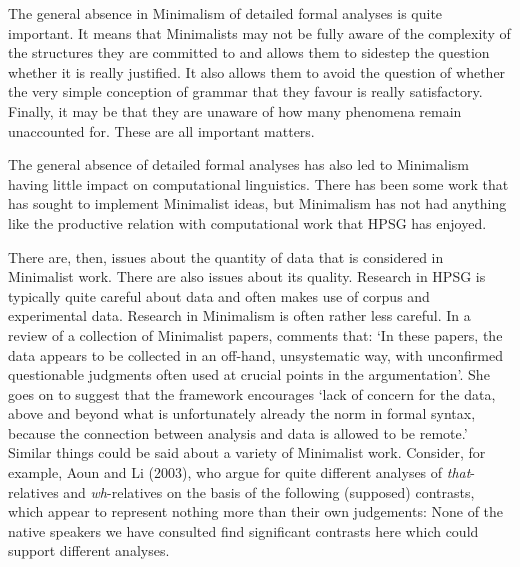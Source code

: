 \documentclass[output=paper]{langsci/langscibook}
\begin{document}
The general absence in Minimalism of detailed formal analyses is quite important. It means that Minimalists may not be fully aware of the complexity of the structures they are committed to and allows them to sidestep the question whether it is really justified. It also allows them to avoid the question of whether the very simple conception of grammar that they favour is really satisfactory. Finally, it may be that they are unaware of how many phenomena remain unaccounted for. These are all important matters. 

The general absence of detailed formal analyses has also led to Minimalism having little impact on computational linguistics. There has been some work that has sought to implement Minimalist ideas, but Minimalism has not had anything like the productive relation with computational work that HPSG has enjoyed.

There are, then, issues about the quantity of data that is considered in Minimalist work. There are also issues about its quality. Research in HPSG is typically quite careful about data and often makes use of corpus and experimental data. Research in Minimalism is often rather less careful. In a review of a collection of Minimalist papers, \citet[434]{Bender2002a} comments that: `In these papers, the data appears to be collected in an off-hand, unsystematic way, with unconfirmed questionable judgments often used at crucial points in the argumentation'. She goes on to suggest that the framework encourages `lack of concern for the data, above and beyond what is unfortunately already the norm in formal syntax, because the connection between analysis and data is allowed to be remote.' Similar things could be said about a variety of Minimalist work. Consider, for example, Aoun and Li (2003), who argue for quite different analyses of \textit{that}-relatives and \textit{wh}-relatives on the basis of the following (supposed) contrasts, which appear to represent nothing more than their own judgements:
\eal
{}\label{ex:min-headway-that}
\label{ex:min-headway-which}
\zl
\eal
{}\label{ex:min-admire-that}
\label{ex:min-admire-which} 
\zl
\eal
{}\label{ex:min-picture-that}
\label{ex:min-picture-which} 
\zl
None of the native speakers we have consulted find significant contrasts here which could support different analyses. 
\end{document}
